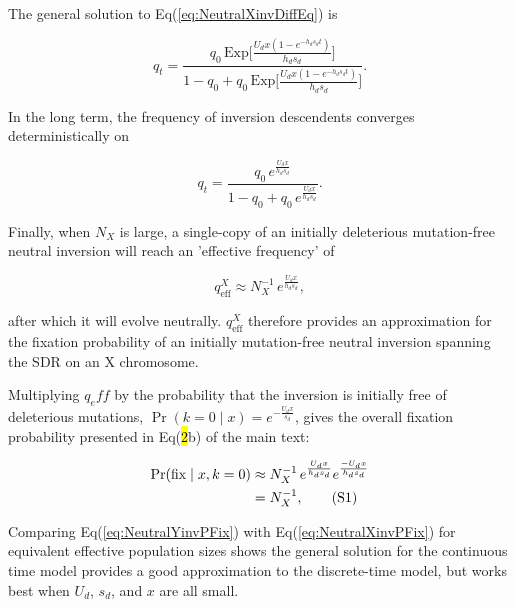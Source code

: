 \documentclass[11pt]{article}
\newcommand\numberthis{\addtocounter{equation}{1}\tag{\theequation}}
\begin{document}
\noindent The general solution to Eq(\ref{eq:NeutralXinvDiffEq}) is

\begin{equation}\label{eq:NeutralXinvGenSol}
	q_{t} = \frac{q_{0} \, \text{Exp}\big[ \frac{U_d x(1 - e^{-h_d s_d t})}{h_d s_d } \big]} {1 - q_{0} + q_0 \, \text{Exp} \big[ \frac{U_d x(1 - e^{-h_d s_d t})}{h_d s_d } \big]}.
\end{equation} 

\noindent In the long term, the frequency of inversion descendents converges deterministically on 

\begin{equation}\label{eq:NeutralXinvqEff}
	q_{t} = \frac{q_{0} \, e^{\frac{U_d x}{h_d s_d }}} {1 - q_{0} + q_0 \, e^{\frac{U_d x}{h_d s_d }}}.
\end{equation} 

\noindent Finally, when $N_X$ is large, a single-copy of an initially deleterious mutation-free neutral inversion will reach an 'effective frequency' of

\begin{equation}\label{eq:NeutralXinvQEff}
	q^X_{\text{eff}} \approx N^{-1}_X \, e^{\frac{U_d x}{h_d s_d }},
\end{equation} 

\noindent after which it will evolve neutrally. $q^X_{\text{eff}}$ therefore provides an approximation for the fixation probability of an initially mutation-free neutral inversion spanning the SDR on an X chromosome. 

Multiplying $q_eff$ by the probability that the inversion is initially free of deleterious mutations, $\Pr(k = 0 \mid x) = e^{-\frac{U_d x}{s_d}}$, gives the overall fixation probability presented in Eq(\hl{2}b) of the main text:

\begin{align*}\label{eq:NeutralXinvPFix}
		\Pr(\text{fix} \mid x, k = 0) &\approx N^{-1}_X \, e^{\frac{U_d x}{h_d s_d}} e^{\frac{-U_d x}{h_d s_d}} \\
		&= N^{-1}_X, \numberthis
\end{align*}

Comparing Eq(\ref{eq:NeutralYinvPFix}) with Eq(\ref{eq:NeutralXinvPFix}) for equivalent effective population sizes shows the general solution for the continuous time model provides a good approximation to the discrete-time model, but works best when $U_d$, $s_d$, and $x$ are all small. 

\newpage{}
\end{document}
